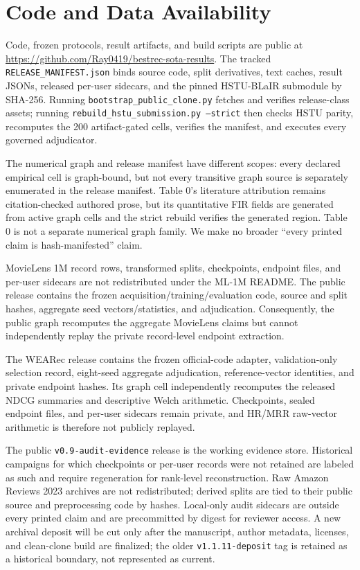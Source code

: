 \section{Code and Data Availability}\label{sec:8}

Code, frozen protocols, result artifacts, and build scripts are public at
\url{https://github.com/Ray0419/bestrec-sota-results}. The tracked
\texttt{RELEASE\_MANIFEST.json} binds source code, split derivatives, text caches,
result JSONs, released per-user sidecars, and the pinned HSTU-BLaIR submodule by
SHA-256. Running \texttt{bootstrap\_public\_clone.py} fetches and verifies
release-class assets; running \texttt{rebuild\_hstu\_submission.py --strict} then
checks HSTU parity, recomputes the 200 artifact-gated cells, verifies the manifest,
and executes every governed adjudicator.

The numerical graph and release manifest have different scopes: every declared empirical
cell is graph-bound, but not every transitive graph source is separately enumerated in the
release manifest. Table 0's literature attribution remains citation-checked authored
prose, but its quantitative FIR fields are generated from active graph cells and the
strict rebuild verifies the generated region. Table 0 is not a separate numerical graph
family. We make no broader ``every printed claim is hash-manifested'' claim.

MovieLens 1M record rows, transformed splits, checkpoints, endpoint files, and
per-user sidecars are not redistributed under the ML-1M README. The public release
contains the frozen acquisition/training/evaluation code, source and split hashes,
aggregate seed vectors/statistics, and adjudication. Consequently, the public graph
recomputes the aggregate MovieLens claims but cannot independently replay the private
record-level endpoint extraction.

The WEARec release contains the frozen official-code adapter, validation-only selection
record, eight-seed aggregate adjudication, reference-vector identities, and private
endpoint hashes. Its graph cell independently recomputes the released NDCG summaries and
descriptive Welch arithmetic. Checkpoints, sealed endpoint files, and per-user sidecars
remain private, and HR/MRR raw-vector arithmetic is therefore not publicly replayed.

The public \texttt{v0.9-audit-evidence} release is the working evidence store.
Historical campaigns for which checkpoints or per-user records were not retained are
labeled as such and require regeneration for rank-level reconstruction. Raw Amazon
Reviews 2023 archives are not redistributed; derived splits are tied to their public
source and preprocessing code by hashes. Local-only audit sidecars are outside every
printed claim and are precommitted by digest for reviewer access. A new archival deposit
will be cut only after the manuscript, author metadata, licenses, and clean-clone build
are finalized; the older \texttt{v1.1.11-deposit} tag is retained as a historical
boundary, not represented as current.
